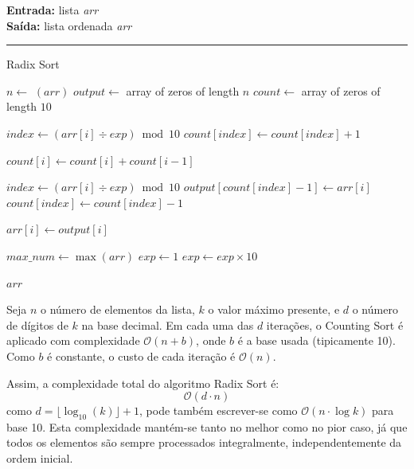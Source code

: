\documentclass[conference]{IEEEtran}
\begin{document}
\begin{algorithm}[H]
    \raggedright
    \vspace{.1em}
    \textbf{Entrada:} lista \textit{arr} \\
    \textbf{Saída:} lista ordenada \textit{arr} \\
    \vspace{.5em}
    \hrule 
    \caption{Radix Sort}
    \begin{algorithmic}[1]
            \State $n \gets$ $(arr)$
            \State $output \gets$ array of zeros of length $n$
            \State $count \gets$ array of zeros of length $10$
    
                \State $index \gets (arr[i] \div exp) \bmod 10$
                \State $count[index] \gets count[index] + 1$
            \EndFor
    
                \State $count[i] \gets count[i] + count[i - 1]$
            \EndFor
    
                \State $index \gets (arr[i] \div exp) \bmod 10$
                \State $output[count[index] - 1] \gets arr[i]$
                \State $count[index] \gets count[index] - 1$
            \EndFor
    
                \State $arr[i] \gets output[i]$
            \EndFor
        \EndFunction
    
        \State $max\_num \gets \max(arr)$
        \State $exp \gets 1$
            \State {}
            \State $exp \gets exp \times 10$
        \EndWhile
    
        \State \Return $arr$
    \end{algorithmic}
\end{algorithm}

Seja \( n \) o número de elementos da lista, \( k \) o valor máximo presente, e \( d \) o número de dígitos de \( k \) na base decimal. Em cada uma das \( d \) iterações, o Counting Sort é aplicado com complexidade \(\mathcal{O}(n + b)\), onde \( b \) é a base usada (tipicamente 10). Como \( b \) é constante, o custo de cada iteração é \(\mathcal{O}(n)\).

Assim, a complexidade total do algoritmo Radix Sort é:
\[
\mathcal{O}(d \cdot n)
\]
como \( d = \lfloor \log_{10}(k) \rfloor + 1 \), pode também escrever-se como \(\mathcal{O}(n \cdot \log k)\) para base 10. Esta complexidade mantém-se tanto no melhor como no pior caso, já que todos os elementos são sempre processados integralmente, independentemente da ordem inicial.
\end{document}
